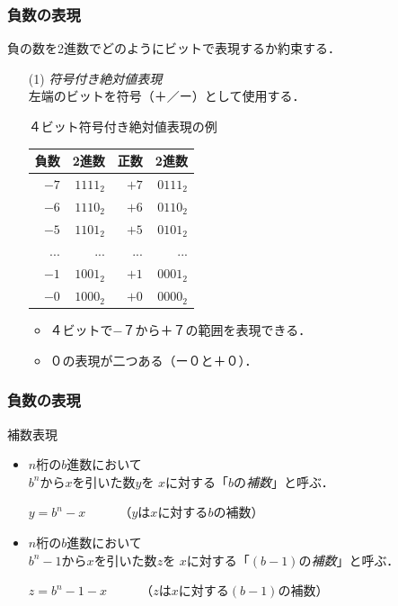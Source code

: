 \documentclass{beamer}                 %
\begin{document}
\begin{frame}
  \frametitle{負数の表現}
負の数を2進数でどのようにビットで表現するか約束する．

\begin{enumerate}
\item[(1)] \emph{符号付き絶対値表現}\\
  左端のビットを符号（＋／ー）として使用する．
  \begin{itembox}[l]{４ビット符号付き絶対値表現の例}
    \begin{minipage}{0.5\columnwidth}
      \begin{tabular}{ r | r || r | r }
        \hline
        \hline
        負数 & 2進数    & 正数 & 2進数 \\
        \hline
        $-7$ & $1111_2$ & $+7$ & $0111_2$ \\
        $-6$ & $1110_2$ & $+6$ & $0110_2$ \\
        $-5$ & $1101_2$ & $+5$ & $0101_2$ \\
        ...  & ...      & ...  & ... \\
        $-1$ & $1001_2$ & $+1$ & $0001_2$ \\
        $-0$ & $1000_2$ & $+0$ & $0000_2$ \\
      \end{tabular}
    \end{minipage}
    \begin{minipage}{0.5\columnwidth}
      \begin{itemize}
      \item ４ビットで−７から＋７の範囲を表現できる．
      \item ０の表現が二つある（ー０と＋０）．
      \end{itemize}
    \end{minipage}
  \end{itembox}
\end{enumerate}
\end{frame}

\begin{frame}
  \frametitle{負数の表現}
  \begin{itembox}[l]{補数表現}
    \begin{itemize}
    \item $n$桁の$b$進数において \\ $b^n$から$x$を引いた数$y$を
      $x$に対する「$b$の\emph{補数}」と呼ぶ．
      \centerline{$y = b^n -x$ ~~~~  （$y$は$x$に対する$b$の補数）}
    \item $n$桁の$b$進数において \\$b^n-1$から$x$を引いた数$z$を
      $x$に対する「$(b-1)$の\emph{補数}」と呼ぶ．
      \centerline{$z = b^n - 1 -x$ ~~~~ （$z$は$x$に対する$(b-1)$の補数）}
    \end{itemize}
  \end{itembox}
\end{frame}
\end{document}
